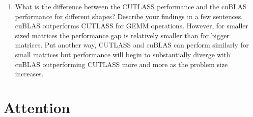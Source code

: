 \documentclass[12pt]{article}
\begin{document}
\begin{enumerate}[label=\textbf{Q\arabic*.}]
\begin{enumerate}
        \item What is the difference between the CUTLASS performance and the cuBLAS performance for different shapes? Describe your findings in a few sentences. \\

        cuBLAS outperforms CUTLASS for GEMM operations. However, for smaller sized matrices the performance gap is relatively smaller than for bigger matrices. Put another way, CUTLASS and cuBLAS can perform similarly for small matrices but performance will begin to substantially diverge with cuBLAS outperforming CUTLASS more and more as the problem size increases. \\

    \end{enumerate}

\end{enumerate}

\section{Attention}
\end{document}
